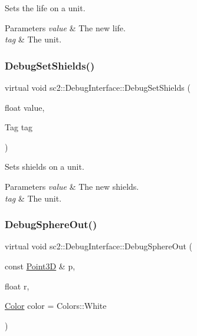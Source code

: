 Sets the life on a unit. 
\begin{DoxyParams}{Parameters}
{\em value} & The new life. \\
\hline
{\em tag} & The unit. \\
\hline
\end{DoxyParams}
\mbox{\label{classsc2_1_1_debug_interface_a003a4d12d81cfb02078623b255b16d17}} 
\subsubsection{\texorpdfstring{Debug\+Set\+Shields()}{DebugSetShields()}}
{\footnotesize\ttfamily virtual void sc2\+::\+Debug\+Interface\+::\+Debug\+Set\+Shields (\begin{DoxyParamCaption}\item[{float}]{value,  }\item[{Tag}]{tag }\end{DoxyParamCaption})\hspace{0.3cm}{\ttfamily [pure virtual]}}

Sets shields on a unit. 
\begin{DoxyParams}{Parameters}
{\em value} & The new shields. \\
\hline
{\em tag} & The unit. \\
\hline
\end{DoxyParams}
\mbox{\label{classsc2_1_1_debug_interface_a9c4b50b0c3b07cd77c4b9c98afc689b0}} 
\subsubsection{\texorpdfstring{Debug\+Sphere\+Out()}{DebugSphereOut()}}
{\footnotesize\ttfamily virtual void sc2\+::\+Debug\+Interface\+::\+Debug\+Sphere\+Out (\begin{DoxyParamCaption}\item[{const \hyperlink{structsc2_1_1_point3_d}{Point3D} \&}]{p,  }\item[{float}]{r,  }\item[{\hyperlink{structsc2_1_1_color}{Color}}]{color = {\ttfamily Colors\+:\+:White} }\end{DoxyParamCaption})\hspace{0.3cm}{\ttfamily [pure virtual]}}

